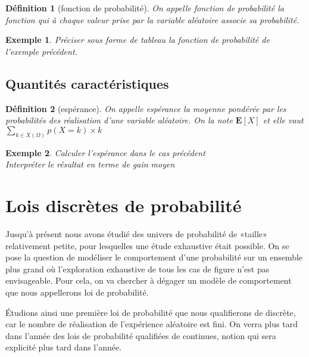 \documentclass[a4ppaer,12pt,french]{article}
\newtheorem{definition}{Définition}
\newtheorem{exemple}{Exemple}
\begin{document}
\begin{definition}[fonction de probabilité]
  On appelle \emph{fonction de probabilité} la fonction qui à chaque
  valeur prise par la variable aléatoire associe sa probabilité.
\end{definition}

\begin{mdframed}
  \begin{exemple}
    \emph{Préciser sous forme de tableau la fonction de probabilité de
    l'exemple précédent.}\\[1.6cm]
  \end{exemple}
\end{mdframed}

\subsection{Quantités caractéristiques}

\begin{definition}[espérance]
  On appelle \emph{espérance} la moyenne pondérée par les probabilités
  des réalisation d'une variable aléatoire. On la note $\mathbf{E}[X]$
  et elle vaut $\sum_{k\in X(\Omega)} p(X=k)\times k$
\end{definition}

\begin{mdframed}
  \begin{exemple}
    \emph{Calculer l'espérance dans le cas précédent}\\[1.6cm]
    \emph{Interpréter le résultat en terme de gain moyen}\\[1.6cm]
  \end{exemple}
\end{mdframed}

\section{Lois discrètes de probabilité}

Jusqu'à présent nous avons étudié des univers de probabilité de «taille»
relativement petite, pour lesquelles une étude exhaustive était possible.
On se pose la question de modéliser le comportement d'une probabilité
sur un ensemble plus grand où l'exploration exhaustive de tous les cas
de figure n'est pas envisageable. Pour cela, on va chercher à dégager un
modèle de comportement que nous appellerons loi de probabilité.

Étudions ainsi une première loi de probabilité que nous qualifierons de
discrète, car le nombre de réalisation de l'expérience aléatoire est
fini. On verra plus tard dans l'année des lois de probabilité qualifiées
de continues, notion qui sera explicité plus tard dans l'année.
\end{document}
